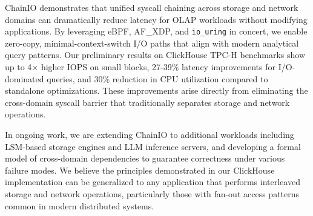 \documentclass[sigconf,10pt]{acmart}
\newcommand{\sys}{ChainIO\xspace}
\begin{document}
\sys demonstrates that unified syscall chaining across storage and network domains can dramatically reduce latency for OLAP workloads without modifying applications. By leveraging eBPF, AF\_XDP, and \texttt{io\_uring} in concert, we enable zero-copy, minimal-context-switch I/O paths that align with modern analytical query patterns. Our preliminary results on ClickHouse TPC-H benchmarks show up to 4× higher IOPS on small blocks, 27-39\% latency improvements for I/O-dominated queries, and 30\% reduction in CPU utilization compared to standalone optimizations. These improvements arise directly from eliminating the cross-domain syscall barrier that traditionally separates storage and network operations.

In ongoing work, we are extending \sys to additional workloads including LSM-based storage engines and LLM inference servers, and developing a formal model of cross-domain dependencies to guarantee correctness under various failure modes. We believe the principles demonstrated in our ClickHouse implementation can be generalized to any application that performs interleaved storage and network operations, particularly those with fan-out access patterns common in modern distributed systems.



\end{document}
